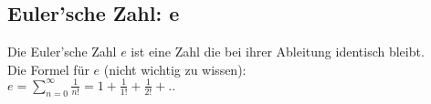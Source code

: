 \subsection{Euler'sche Zahl: e}
Die Euler'sche Zahl $e$ ist eine Zahl die bei ihrer Ableitung identisch bleibt. \\
Die Formel für $e$ (nicht wichtig zu wissen): \\
$e = \sum_{n=0}^{\infty} \frac{1}{n!} = 1 + \frac{1}{1!} + \frac{1}{2!} + ..$
